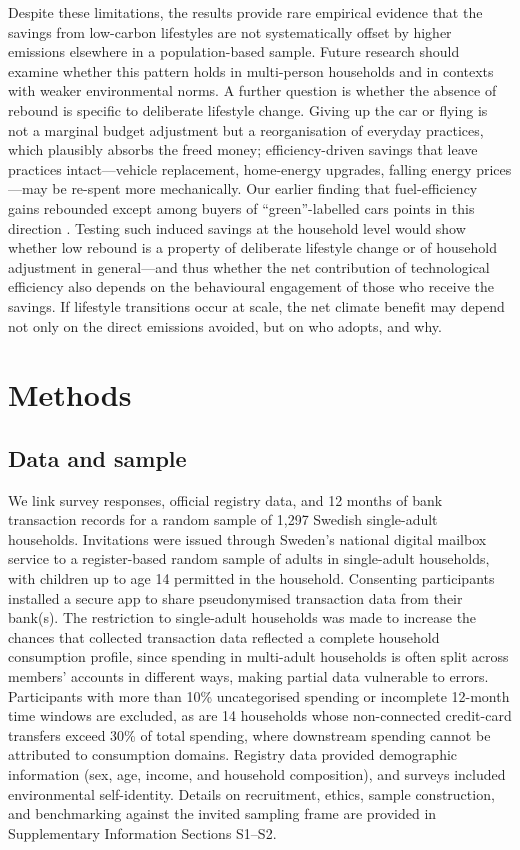 \documentclass[sn-nature]{sn-jnl}
\begin{document}
Despite these limitations, the results provide rare empirical evidence that the savings from low-carbon lifestyles are not systematically offset by higher emissions elsewhere in a population-based sample. Future research should examine whether this pattern holds in multi-person households and in contexts with weaker environmental norms. A further question is whether the absence of rebound is specific to deliberate lifestyle change. Giving up the car or flying is not a marginal budget adjustment but a reorganisation of everyday practices, which plausibly absorbs the freed money; efficiency-driven savings that leave practices intact---vehicle replacement, home-energy upgrades, falling energy prices---may be re-spent more mechanically. Our earlier finding that fuel-efficiency gains rebounded except among buyers of ``green''-labelled cars points in this direction \citep{andersson2019estimating}. Testing such induced savings at the household level would show whether low rebound is a property of deliberate lifestyle change or of household adjustment in general---and thus whether the net contribution of technological efficiency also depends on the behavioural engagement of those who receive the savings. If lifestyle transitions occur at scale, the net climate benefit may depend not only on the direct emissions avoided, but on who adopts, and why.

\section{Methods}
\subsection{Data and sample}

We link survey responses, official registry data, and 12 months of bank transaction records for a random sample of 1{,}297 Swedish single-adult households. Invitations were issued through Sweden's national digital mailbox service to a register-based random sample of adults in single-adult households, with children up to age 14 permitted in the household. Consenting participants installed a secure app to share pseudonymised transaction data from their bank(s). The restriction to single-adult households was made to increase the chances that collected transaction data reflected a complete household consumption profile, since spending in multi-adult households is often split across members' accounts in different ways, making partial data vulnerable to errors. Participants with more than 10\% uncategorised spending or incomplete 12-month time windows are excluded, as are 14 households whose non-connected credit-card transfers exceed 30\% of total spending, where downstream spending cannot be attributed to consumption domains. Registry data provided demographic information (sex, age, income, and household composition), and surveys included environmental self-identity. Details on recruitment, ethics, sample construction, and benchmarking against the invited sampling frame are provided in Supplementary Information Sections S1--S2.
\end{document}
